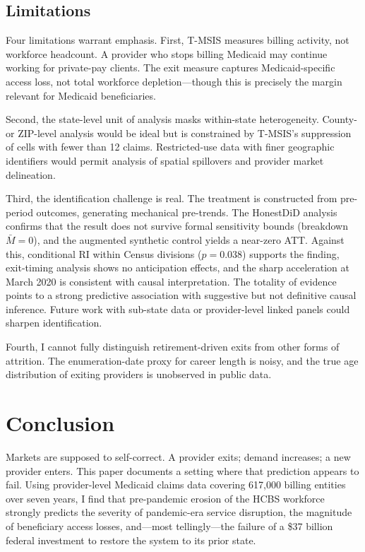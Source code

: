 \documentclass[12pt]{article}
\begin{document}
\subsection{Limitations}

Four limitations warrant emphasis. First, T-MSIS measures billing activity, not workforce headcount. A provider who stops billing Medicaid may continue working for private-pay clients. The exit measure captures Medicaid-specific access loss, not total workforce depletion---though this is precisely the margin relevant for Medicaid beneficiaries.

Second, the state-level unit of analysis masks within-state heterogeneity. County- or ZIP-level analysis would be ideal but is constrained by T-MSIS's suppression of cells with fewer than 12 claims. Restricted-use data with finer geographic identifiers would permit analysis of spatial spillovers and provider market delineation.

Third, the identification challenge is real. The treatment is constructed from pre-period outcomes, generating mechanical pre-trends. The HonestDiD analysis confirms that the result does not survive formal sensitivity bounds (breakdown $\bar{M} = 0$), and the augmented synthetic control yields a near-zero ATT. Against this, conditional RI within Census divisions ($p = 0.038$) supports the finding, exit-timing analysis shows no anticipation effects, and the sharp acceleration at March 2020 is consistent with causal interpretation. The totality of evidence points to a strong predictive association with suggestive but not definitive causal inference. Future work with sub-state data or provider-level linked panels could sharpen identification.

Fourth, I cannot fully distinguish retirement-driven exits from other forms of attrition. The enumeration-date proxy for career length is noisy, and the true age distribution of exiting providers is unobserved in public data.


\section{Conclusion}

Markets are supposed to self-correct. A provider exits; demand increases; a new provider enters. This paper documents a setting where that prediction appears to fail. Using provider-level Medicaid claims data covering 617,000 billing entities over seven years, I find that pre-pandemic erosion of the HCBS workforce strongly predicts the severity of pandemic-era service disruption, the magnitude of beneficiary access losses, and---most tellingly---the failure of a \$37 billion federal investment to restore the system to its prior state.
\end{document}

